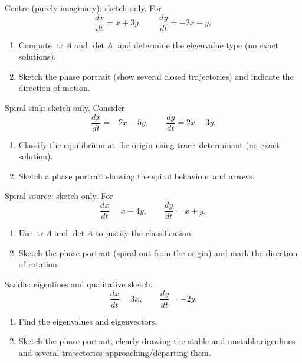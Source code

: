 \documentclass[11pt]{article}
\def\textbf#1{#1}%
\newcounter{question}
\begin{document}
\newpage
\begin{question}
\textbf{Centre (purely imaginary): sketch only.}
For
\[
\frac{dx}{dt}=x+3y,\qquad \frac{dy}{dt}=-2x-y,
\]
\begin{enumerate}
  \item Compute $\operatorname{tr}A$ and $\det A$, and determine the eigenvalue type (no exact solutions).
  \item Sketch the phase portrait (show several closed trajectories) and indicate the direction of motion.
\end{enumerate}
\begin{center}
\end{center}
\end{question}

\begin{question}
\textbf{Spiral sink: sketch only.}
Consider
\[
\frac{dx}{dt}=-2x-5y,\qquad \frac{dy}{dt}=2x-3y.
\]
\begin{enumerate}
  \item Classify the equilibrium at the origin using trace–determinant (no exact solution).
  \item Sketch a phase portrait showing the spiral behaviour and arrows.
\end{enumerate}
\end{question}

\begin{question}
\textbf{Spiral source: sketch only.}
For
\[
\frac{dx}{dt}=x-4y,\qquad \frac{dy}{dt}=x+y,
\]
\begin{enumerate}
  \item Use $\operatorname{tr}A$ and $\det A$ to justify the classification.
  \item Sketch the phase portrait (spiral out from the origin) and mark the direction of rotation.
\end{enumerate}
\end{question}

\begin{question}
\textbf{Saddle: eigenlines and qualitative sketch.}
\[
\frac{dx}{dt}=3x,\qquad \frac{dy}{dt}=-2y.
\]
\begin{enumerate}
  \item Find the eigenvalues and eigenvectors.
  \item Sketch the phase portrait, clearly drawing the stable and unstable eigenlines and several trajectories approaching/departing them.
\end{enumerate}
\end{question}
\end{document}
